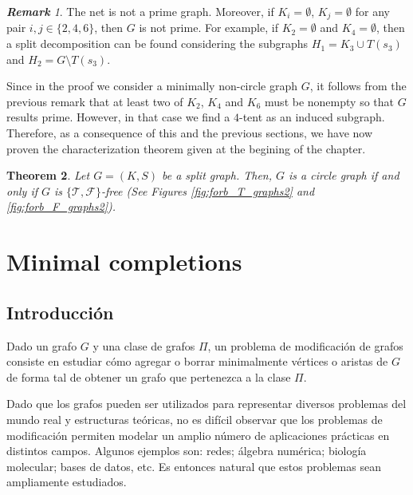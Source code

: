 \documentclass[12pt]{book}
\theoremstyle{plain}
\newtheorem{teo}{Theorem}[chapter]
\theoremstyle{remark}
\newtheorem{remark}[teo]{\textbf{\textit{Remark}}}
\begin{document}
\begin{remark}
The net is not a prime graph. Moreover, if $K_i = \emptyset$, $K_j = \emptyset$ for any pair $i, j \in \{2,4,6\}$, then $G$ is not prime.
For example, if $K_2 = \emptyset$ and $K_4 = \emptyset$, then a split decomposition can be found considering the subgraphs $H_1 = K_3 \cup T(s_3)$ and $H_2 = G \setminus T(s_3)$.
\end{remark}

Since in the proof we consider a minimally non-circle graph $G$, it follows from the previous remark that at least two of $K_2$, $K_4$ and $K_6$ must be nonempty so that $G$ results prime. However, in that case we find a $4$-tent as an induced subgraph. Therefore, as a consequence of this and the previous sections, we have now proven the characterization theorem given at the begining of the chapter.

\begin{teo}
Let $G=(K,S)$ be a split graph. Then, $G$ is a circle graph if and only if $G$ is $\{ \mathcal{T}, \mathcal{F}\}$-free (See Figures \ref{fig:forb_T_graphs2} and \ref{fig:forb_F_graphs2}).
\end{teo}






\part{Minimal completions}




%
\chapter*{Introducción}

Dado un grafo $G$ y una clase de grafos $\Pi$, un problema de modificación de grafos consiste en estudiar cómo agregar o borrar minimalmente vértices o aristas de $G$ de forma tal de obtener un grafo que pertenezca a la clase $\Pi$.

Dado que los grafos pueden ser utilizados para representar diversos problemas del mundo real y estructuras teóricas, no es difícil observar que los problemas de modificación permiten modelar un amplio número de aplicaciones prácticas en distintos campos. Algunos ejemplos son: redes; álgebra numérica; biología molecular; bases de datos, etc. Es entonces natural que estos problemas sean ampliamente estudiados. 
\end{document}
